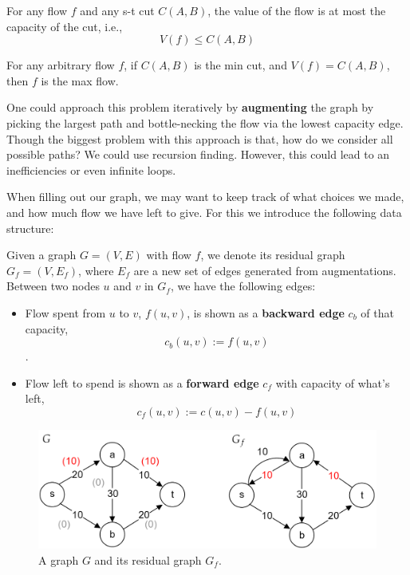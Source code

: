 \begin{Def}

    For any flow $f$ and any s-t cut $C(A,B)$, the value of the flow is at most the capacity of the cut, i.e.,
    \begin{equation}
        V(f) \leq C(A,B)
    \end{equation}
\end{Def}

\begin{Def}

    For any arbitrary flow $f$, if $C(A,B)$ is the min cut, and $V(f)=C(A,B)$, then $f$ is the max flow.
\end{Def}

\noindent
One could approach this problem iteratively by \textbf{augmenting} the graph by picking the largest path and 
bottle-necking the flow via the lowest capacity edge.\\

\noindent
Though the biggest problem with this approach is that, how do we consider all possible paths? We
could use recursion finding. However, this could lead to an inefficiencies or even infinite loops.

\newpage
\noindent
When filling out our graph, we may want to keep track of what choices we made, and how much flow we have left to give.
For this we introduce the following data structure:
\begin{Def}

    Given a graph $G=(V,E)$ with flow $f$, we denote its residual graph $G_f = (V,E_f)$, where $E_f$ are a new set of edges generated from augmentations.
    Between two nodes $u$ and $v$ in $G_f$, we have the following edges:
    \begin{itemize}
        \item Flow spent from $u$ to $v$, $f(u,v)$, is shown as a \textbf{backward edge} $c_b$ of that capacity, $$c_b(u,v):= f(u,v)$$.
        
        \vspace{-2em}
        \item Flow left to spend is shown as a \textbf{forward edge} $c_f$ with capacity of what's left, $$c_f(u,v) := c(u,v) - f(u,v)$$
    \end{itemize}

    \vspace{-1em}
\end{Def}

\vspace{-1em}
\begin{figure}[h]
    \centering
    \includegraphics[width=.8\textwidth]{Sections/net/res.png}
    \caption{A graph $G$ and its residual graph $G_f$.}
\end{figure}

